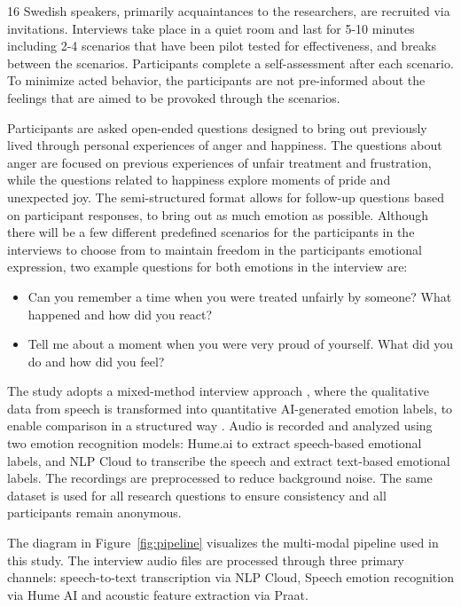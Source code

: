 16 Swedish speakers, primarily acquaintances to the researchers, are recruited via invitations. Interviews take place in a quiet room and last for 5-10 minutes including 2-4 scenarios that have been pilot tested for effectiveness, and breaks between the scenarios. Participants complete a self-assessment after each scenario. To minimize acted behavior, the participants are not pre-informed about the feelings that are aimed to be provoked through the scenarios.

Participants are asked open-ended questions designed to bring out previously lived through personal experiences of anger and happiness. The questions about anger are focused on previous experiences of unfair treatment and frustration, while the questions related to happiness explore moments of pride and unexpected joy. The semi-structured format allows for follow-up questions based on participant responses, to bring out as much emotion as possible.
Although there will be a few different predefined scenarios for the participants in the interviews to choose from to maintain freedom in the participants emotional expression, two example questions for both emotions in the interview are:
\begin{itemize}
    \item Can you remember a time when you were treated unfairly by someone? What happened and how did you react?
    \item Tell me about a moment when you were very proud of yourself. What did you do and how did you feel?
\end{itemize}
The study adopts a mixed-method interview approach \autocite{Bryman2022}, where the qualitative data from speech is transformed into quantitative AI-generated emotion labels, to enable comparison in a structured way \autocite{Creswell2023}.
Audio is recorded and analyzed using two emotion recognition models: Hume.ai to extract speech-based emotional labels, and NLP Cloud to transcribe the speech and extract text-based emotional labels. The recordings are preprocessed to reduce background noise. The same dataset is used for all research questions to ensure consistency and all participants remain anonymous.

The diagram in Figure~\ref{fig:pipeline} visualizes the multi-modal pipeline used in this study.  
The interview audio files are processed through three primary channels: speech-to-text transcription via NLP Cloud,  
Speech emotion recognition via Hume AI and acoustic feature extraction via Praat.  

